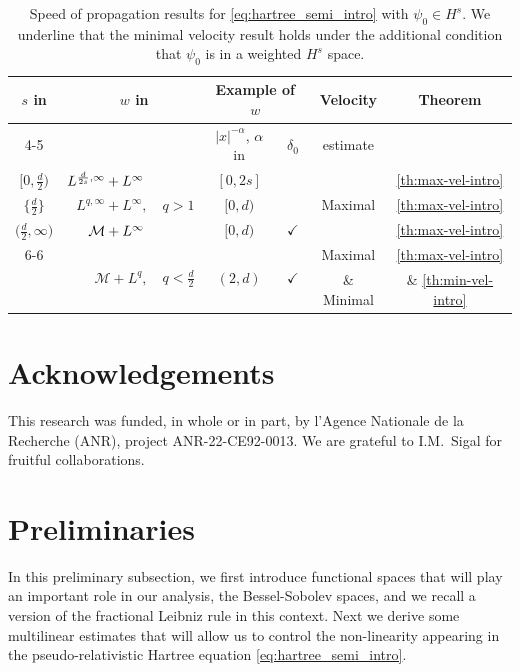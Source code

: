 \documentclass[12pt]{article}
\theoremstyle{plain}
\newcommand{\meas}{\mathcal{M}}
\begin{document}
%
\begin{table}[H]
    \centering
	\begin{tabular}{c|rl|c|c|c|c}
\multirow{2}{*}{$s$ in} & \multirow{2}{*}{$w$ in} &  & \multicolumn{2}{c|}{Example of $w$} & Velocity & \multirow{2}{*}{Theorem}\tabularnewline
\cline{4-5} \cline{5-5} 
 &  &  & $|x|^{-\alpha}$, $\alpha$ in & $\ \delta_{0}\ $ & estimate & \tabularnewline
\hline 
$\big[0,\frac{d}{2}\big)$ & $L^{\frac{d}{2s},\infty}+L^{\infty}\text{\ensuremath{\phantom{,}}}$ &  & $[0,2s]$ &  & \multirow{3}{*}{Maximal} & \ref{th:max-vel-intro}\tabularnewline
$\big\{\frac{d}{2}\big\}$ & $L^{q,\infty}+L^{\infty},$ & \negthickspace{}\negthickspace{}$q>1$ & $[0,d)$ &  &  & \ref{th:max-vel-intro}\tabularnewline
$\big(\frac{d}{2},\infty\big)$ & $\meas+L^{\infty}\text{\ensuremath{\phantom{,}}}$ &  & $[0,d)$ & $\checkmark$ &  & \ref{th:max-vel-intro}\tabularnewline
\cline{6-6}
\multirow{2}{*}{$\big[\frac{d}{2}+1,\infty\big)$} & \multirow{2}{*}{$\mathcal{M}+L^{q},$} & \multirow{2}{*}{\negthickspace{}\negthickspace{}$q<\frac{d}{2}$} & \multirow{2}{*}{$(2,d)$} & \multirow{2}{*}{$\checkmark$} & Maximal & \ref{th:max-vel-intro}\tabularnewline
 &  &  &  &  & \& Minimal & \& \ref{th:min-vel-intro}\tabularnewline
\end{tabular}
	\caption{Speed of propagation results for \eqref{eq:hartree_semi_intro} with $\psi_0 \in H^s$. We underline that the minimal velocity result holds under the additional condition that $\psi_0$ is in a weighted $H^s$ space.} 
    \label{tab:speed}
\end{table}
%
\section*{Acknowledgements}
This research was funded, in whole or in part, by l’Agence Nationale de la Recherche
(ANR), project ANR-22-CE92-0013. We are grateful to I.M.~Sigal for fruitful collaborations. 



\section{Preliminaries}\label{sec:prelim}

 In this preliminary subsection, we first introduce functional spaces that will play an important role in our analysis, the Bessel-Sobolev spaces, and we recall a version of the fractional Leibniz rule in this context. Next we derive some multilinear estimates that will allow us to control the non-linearity appearing in the pseudo-relativistic Hartree equation \eqref{eq:hartree_semi_intro}.
\end{document}
